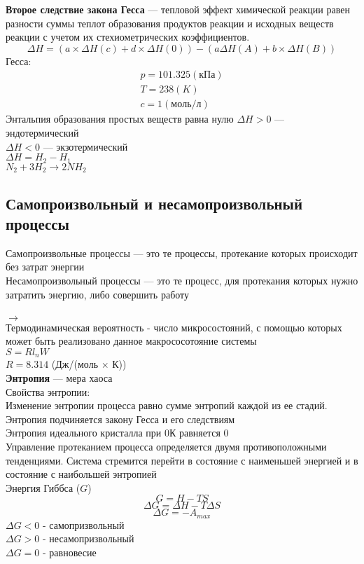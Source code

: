 \documentclass[a4paper, 12pt, oneside]{article}
\begin{document}
{\bfseries Второе следствие закона Гесса} --- тепловой эффект химической реакции равен разности суммы теплот образования продуктов реакции и исходных веществ реакции с учетом их стехиометрических коэффициентов.
$$
\varDelta H = (a\times \varDelta H(c) + d\times \varDelta H(0))-(a \varDelta H(A)+b\times \varDelta H(B))
$$
\newpage
{ Гесса:}
\begin{gather*}
	p=101.325 (кПа)\\
	T=238 (K)\\
	c = 1 (моль/л)
\end{gather*}
Энтальпия образования простых веществ равна нулю
$\varDelta H>0$ --- эндотермический\\
$\varDelta H<0$ --- экзотермический\\
$\varDelta H = H_2-H_1$\\
$N_2+3H_2 \longrightarrow 2NH_2$\\

\subsection{Самопроизвольный и несамопроизвольный процессы}

Самопроизвольные процессы --- это те процессы, протекание которых происходит без затрат энергии\\
Несамопроизвольный процессы --- это те процесс, для протекания которых нужно затратить энергию, либо совершить работу\\\\
 $\rightarrow$ \\

Термодинамическая вероятность - число микросостояний, с помощью которых может быть реализовано данное макрососотояние системы\\
$S=Rl_nW$\\
$R=8.314$ (Дж/(моль $\times$ К))\\
{\bfseries Энтропия} --- мера хаоса\\
Свойства энтропии:\\
Изменение энтропии процесса равно сумме энтропий каждой из ее стадий. Энтропия подчиняется закону Гесса и его следствиям\\
Энтропия идеального кристалла при 0К равняется  0\\
Управление протеканием процесса определяется двумя противоположными тенденциями. Система стремится перейти в состояние с наименьшей энергией и в состояние с наибольшей энтропией\\
Энергия Гиббса ($G$)
$$G=H-TS$$
$$\varDelta G = \varDelta H-T\varDelta S$$
$$\varDelta G = -A_{max}$$
$\varDelta G<0$ - самопризвольный\\
$\varDelta G>0$ - несамопризвольный\\
$\varDelta G=0$ - равновесие\\
\end{document}
